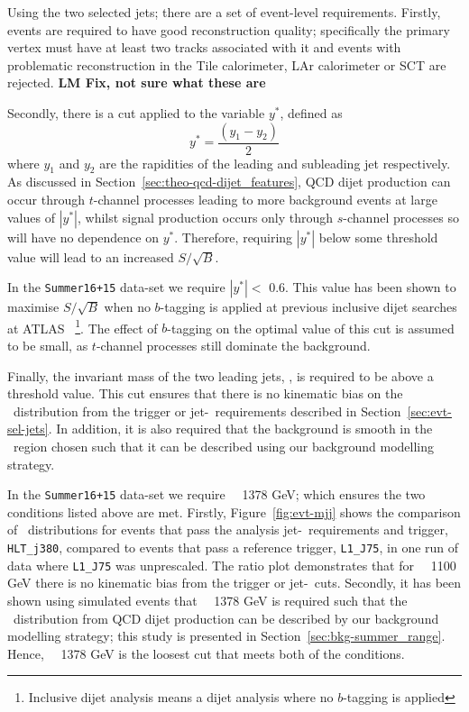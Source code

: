Using the two selected jets; there are a set of event-level requirements.
Firstly, events are required to have good reconstruction quality;
specifically the primary vertex
must have at least two tracks associated with it
and events with problematic reconstruction in the Tile calorimeter, LAr calorimeter or SCT are rejected.
\textbf{LM Fix, not sure what these are}

\noindent
Secondly, there is a cut applied to the variable $y^*$, defined as
\begin{equation}
  y^* = \frac{(y_1-y_2)}{2}
\end{equation}
where $y_1$ and $y_2$ are the rapidities of the leading and subleading jet respectively.
As discussed in Section~\ref{sec:theo-qcd-dijet_features}, QCD dijet production can occur through $t$-channel processes leading to more background events at large values of $|y^*|$,
whilst signal production occurs only through $s$-channel processes so will have no dependence on $y^*$.
Therefore, requiring $|y^*|$ below some threshold value will lead to an increased $S/\sqrt{B}$.

In the \verb|Summer16+15| data-set we require $|y^*| <$ 0.6.
This value has been shown to maximise $S/\sqrt{B}$ when no $b$-tagging is applied
at previous inclusive dijet searches at ATLAS~\cite{dijet-mori16_paper}
\footnote{Inclusive dijet analysis means a dijet analysis where no $b$-tagging is applied}.
The effect of $b$-tagging on the optimal value of this cut is assumed to be small,
as $t$-channel processes still dominate the background.

Finally, the invariant mass of the two leading jets, \mjj, is required to be above a threshold value.
This cut ensures that there is no kinematic bias on the \mjj~distribution
from the trigger or jet-\pT~requirements described in Section~\ref{sec:evt-sel-jets}.
In addition, it is also required that the background is smooth in the \mjj~region chosen
such that it can be described using our background modelling strategy.

In the \verb|Summer16+15| data-set we require \mjj~\gt~1378 GeV;
which ensures the two conditions listed above are met.
Firstly, Figure~\ref{fig:evt-mjj} shows the comparison of \mjj~distributions for events
that pass the analysis jet-\pT~requirements and  trigger, \verb|HLT_j380|, compared to events that pass a reference trigger, \verb|L1_J75|,
in one run of data where \verb|L1_J75| was unprescaled.
The ratio plot demonstrates that for \mjj~\gt~1100 GeV there is no kinematic bias from the trigger or jet-\pT~cuts.
Secondly, it has been shown using simulated events that
\mjj~\gt~1378 GeV is required such that the \mjj~distribution from QCD dijet production
can be described by our background modelling strategy;
this study is presented in Section~\ref{sec:bkg-summer_range}.
Hence, \mjj~\gt~1378 GeV is the loosest cut that meets both of the conditions.

